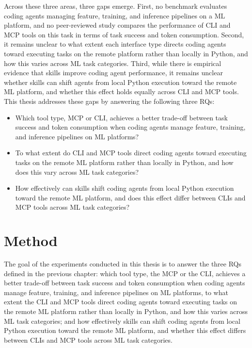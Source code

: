 \documentclass[
english,                 %
bibtex,                  %
includeExtraAbstracts, %
]{kththesis}
\numberwithin{listing}{chapter}
\begin{document}
Across these three areas, three gaps emerge. First, no benchmark evaluates coding agents managing feature, training, and inference pipelines on a \gls{ML} platform, and no peer-reviewed study compares the performance of \gls{CLI} and \gls{MCP} tools on this task in terms of task success and token consumption. Second, it remains unclear to what extent each interface type directs coding agents toward executing tasks on the remote platform rather than locally in Python, and how this varies across \gls{ML} task categories. Third, while there is empirical evidence that skills improve coding agent performance, it remains unclear whether skills can shift agents from local Python execution toward the remote \gls{ML} platform, and whether this effect holds equally across \gls{CLI} and \gls{MCP} tools. This thesis addresses these gaps by answering the following three \glspl{RQ}:

\glsresetall
\begin{itemize}
\item Which tool type, \gls{MCP} or \gls{CLI}, achieves a better trade-off between task success and token consumption when coding agents manage feature, training, and inference pipelines on \gls{ML} platforms?
\item To what extent do \gls{CLI} and \gls{MCP} tools direct coding agents toward executing tasks on the remote \gls{ML} platform rather than locally in Python, and how does this vary across \gls{ML} task categories?
\item How effectively can skills shift coding agents from local Python execution toward the remote \gls{ML} platform, and does this effect differ between \glspl{CLI} and \gls{MCP} tools across \gls{ML} task categories?
\end{itemize}

\cleardoublepage

\chapter{Method}

\glsresetall

The goal of the experiments conducted in this thesis is to answer the three \glspl{RQ} defined in the previous chapter: which tool type, the \gls{MCP} or the \gls{CLI}, achieves a better trade-off between task success and token consumption when coding agents manage feature, training, and inference pipelines on \gls{ML} platforms, to what extent the \gls{CLI} and \gls{MCP} tools direct coding agents toward executing tasks on the remote \gls{ML} platform rather than locally in Python, and how this varies across \gls{ML} task categories; and how effectively skills can shift coding agents from local Python execution toward the remote \gls{ML} platform, and whether this effect differs between \glspl{CLI} and \gls{MCP} tools across \gls{ML} task categories.
\end{document}

